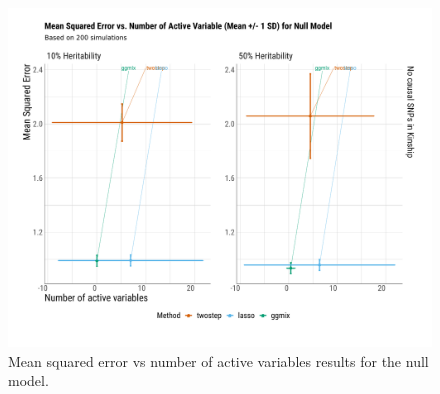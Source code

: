 \documentclass[12pt,letter]{article}\usepackage[]{graphicx}\usepackage[]{color}
\newenvironment{knitrout}{}{} %
\begin{document}
\begin{knitrout}\scriptsize
{}\color{fgcolor}\begin{figure}[H]

{\centering \includegraphics[width=1\linewidth]{figure/plot-mse-nactive-sim-null-1} 

}

\caption[Mean squared error vs number of active variables results for the null model]{Mean squared error vs number of active variables results for the null model.}\label{fig:plot-mse-nactive-sim-null}
\end{figure}


\end{knitrout}
\end{document}
